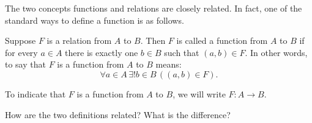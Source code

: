 \documentclass[12pt]{amsart}
\begin{document}
\begin{problem}
    The two concepts functions and relations are closely related.
    In fact, one of the standard ways to define a function is as follows.

    
    \begin{definition}
        Suppose $F$ is a relation from $A$ to $B$. Then $F$ is called a function from $A$ to $B$ if for every $a \in A$ there is exactly one $b \in B$ such that $(a, b) \in F$. In other words, to say that $F$ is a function from $A$ to $B$ means:
\[
\forall a \in A \, \exists! b \in B \, ((a, b) \in F).
\]

To indicate that $F$ is a function from $A$ to $B$, we will write $F : A \to B$.
    \end{definition}

    How are the two definitions related? What is the difference?
\end{problem}
\end{document}
